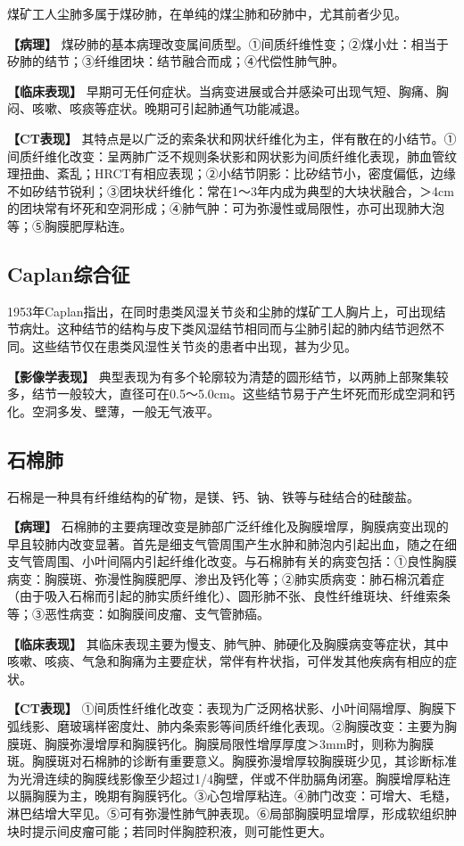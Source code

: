 煤矿工人尘肺多属于煤矽肺，在单纯的煤尘肺和矽肺中，尤其前者少见。

\textbf{【病理】}
煤矽肺的基本病理改变属间质型。①间质纤维性变；②煤小灶：相当于矽肺的结节；③纤维团块：结节融合而成；④代偿性肺气肿。

\textbf{【临床表现】}
早期可无任何症状。当病变进展或合并感染可出现气短、胸痛、胸闷、咳嗽、咳痰等症状。晚期可引起肺通气功能减退。

\textbf{【CT表现】}
其特点是以广泛的索条状和网状纤维化为主，伴有散在的小结节。①间质纤维化改变：呈两肺广泛不规则条状影和网状影为间质纤维化表现，肺血管纹理扭曲、紊乱；HRCT有相应表现；②小结节阴影：比矽结节小，密度偏低，边缘不如矽结节锐利；③团块状纤维化：常在1～3年内成为典型的大块状融合，＞4cm的团块常有坏死和空洞形成；④肺气肿：可为弥漫性或局限性，亦可出现肺大泡等；⑤胸膜肥厚粘连。

\subsection{Caplan综合征}

1953年Caplan指出，在同时患类风湿关节炎和尘肺的煤矿工人胸片上，可出现结节病灶。这种结节的结构与皮下类风湿结节相同而与尘肺引起的肺内结节迥然不同。这些结节仅在患类风湿性关节炎的患者中出现，甚为少见。

\textbf{【影像学表现】}
典型表现为有多个轮廓较为清楚的圆形结节，以两肺上部聚集较多，结节一般较大，直径可在0.5～5.0cm。这些结节易于产生坏死而形成空洞和钙化。空洞多发、壁薄，一般无气液平。

\subsection{石棉肺}

石棉是一种具有纤维结构的矿物，是镁、钙、钠、铁等与硅结合的硅酸盐。

\textbf{【病理】}
石棉肺的主要病理改变是肺部广泛纤维化及胸膜增厚，胸膜病变出现的早且较肺内改变显著。首先是细支气管周围产生水肿和肺泡内引起出血，随之在细支气管周围、小叶间隔内引起纤维化改变。与石棉肺有关的病变包括：①良性胸膜病变：胸膜斑、弥漫性胸膜肥厚、渗出及钙化等；②肺实质病变：肺石棉沉着症（由于吸入石棉而引起的肺实质纤维化）、圆形肺不张、良性纤维斑块、纤维索条等；③恶性病变：如胸膜间皮瘤、支气管肺癌。

\textbf{【临床表现】}
其临床表现主要为慢支、肺气肿、肺硬化及胸膜病变等症状，其中咳嗽、咳痰、气急和胸痛为主要症状，常伴有杵状指，可伴发其他疾病有相应的症状。

\textbf{【CT表现】}
①间质性纤维化改变：表现为广泛网格状影、小叶间隔增厚、胸膜下弧线影、磨玻璃样密度灶、肺内条索影等间质纤维化表现。②胸膜改变：主要为胸膜斑、胸膜弥漫增厚和胸膜钙化。胸膜局限性增厚厚度＞3mm时，则称为胸膜斑。胸膜斑对石棉肺的诊断有重要意义。胸膜弥漫增厚较胸膜斑少见，其诊断标准为光滑连续的胸膜线影像至少超过1/4胸壁，伴或不伴肋膈角闭塞。胸膜增厚粘连以膈胸膜为主，晚期有胸膜钙化。③心包增厚粘连。④肺门改变：可增大、毛糙，淋巴结增大罕见。⑤可有弥漫性肺气肿表现。⑥局部胸膜明显增厚，形成软组织肿块时提示间皮瘤可能；若同时伴胸腔积液，则可能性更大。

